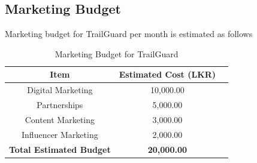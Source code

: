 \documentclass[a4paper,11pt]{article}%
\begin{document}
\subsection{Marketing Budget} 
Marketing budget for TrailGuard per month is estimated as follows
\begin{table}[h]
    \centering
    \begin{tabular}{|c|c|c|}
        \hline
        \textbf{Item} & \textbf{Estimated Cost (LKR)} \\ \hline
        Digital Marketing & 10,000.00 \\ \hline
        Partnerships & 5,000.00 \\ \hline
        Content Marketing & 3,000.00 \\ \hline
        Influencer Marketing & 2,000.00 \\ \hline
        \textbf{Total Estimated Budget} & \textbf{20,000.00} \\ \hline
    \end{tabular}
    \caption{Marketing Budget for TrailGuard}
    \label{table:marketing_budget}\
\end{table}

% 

\end{document}
